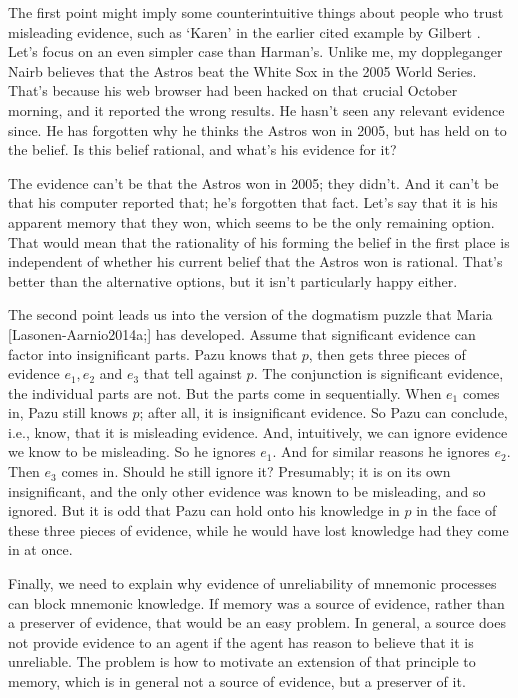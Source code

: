 The first point might imply some counterintuitive things about people who trust misleading evidence, such as `Karen' in the earlier cited example by Gilbert  \citet[Ch. 4]{Harman1986}. Let's focus on an even simpler case than Harman's. Unlike me, my doppleganger Nairb believes that the Astros beat the White Sox in the 2005 World Series. That's because his web browser had been hacked on that crucial October morning, and it reported the wrong results. He hasn't seen any relevant evidence since. He has forgotten why he thinks the Astros won in 2005, but has held on to the belief. Is this belief rational, and what's his evidence for it?

The evidence can't be that the Astros won in 2005; they didn't. And it can't be that his computer reported that; he's forgotten that fact. Let's say that it is his apparent memory that they won, which seems to be the only remaining option. That would mean that the rationality of his forming the belief in the first place is independent of whether his current belief that the Astros won is rational. That's better than the alternative options, but it isn't particularly happy either.

The second point leads us into the version of the dogmatism puzzle that Maria [Lasonen-Aarnio2014a;] has developed. Assume that significant evidence can factor into insignificant parts. Pazu knows that $p$, then gets three pieces of evidence $e_1, e_2$ and $e_3$ that tell against $p$. The conjunction is significant evidence, the individual parts are not. But the parts come in sequentially. When $e_1$ comes in, Pazu still knows $p$; after all, it is insignificant evidence. So Pazu can conclude, i.e., know, that it is misleading evidence. And, intuitively, we can ignore evidence we know to be misleading. So he ignores $e_1$. And for similar reasons he ignores $e_2$. Then $e_3$ comes in. Should he still ignore it? Presumably; it is on its own insignificant, and the only other evidence was known to be misleading, and so ignored. But it is odd that Pazu can hold onto his knowledge in $p$ in the face of these three pieces of evidence, while he would have lost knowledge had they come in at once.

Finally, we need to explain why evidence of unreliability of mnemonic processes can block mnemonic knowledge. If memory was a source of evidence, rather than a preserver of evidence, that would be an easy problem. In general, a source does not provide evidence to an agent if the agent has reason to believe that it is unreliable. The problem is how to motivate an extension of that principle to memory, which is in general not a source of evidence, but a preserver of it.

